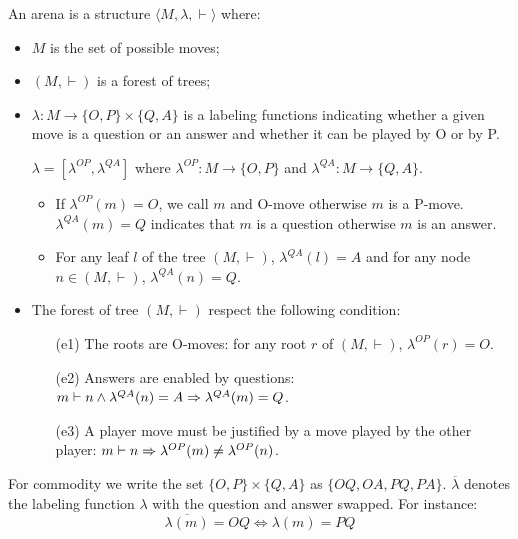 \begin{dfn}[Arena]
An arena is a structure $\langle M, \lambda, \vdash \rangle$ where:
\begin{itemize}
\item $M$ is the set of possible moves;
\item $(M,\vdash)$ is a forest of trees;

\item $\lambda : M \rightarrow \{ O, P\} \times \{Q, A\}$ is a labeling functions indicating whether a given move
    is a question or an answer and whether it can be played by O or by P.

    $\lambda = [\lambda^{OP},\lambda^{QA}]$ where $\lambda^{OP} : M \rightarrow  \{ O, P\}$
    and $\lambda^{QA} : M \rightarrow  \{ Q, A\}$.

    \begin{itemize}
    \item If $\lambda^{OP} (m) = O$, we call $m$ and O-move otherwise $m$ is a P-move.
    $\lambda^{QA} (m) = Q$ indicates that $m$ is a question otherwise $m$ is an answer.

    \item For any leaf $l$ of the tree $(M,\vdash)$, $\lambda^{QA} (l) = A$ and for any node
    $n \in (M,\vdash)$, $\lambda^{QA} (n) = Q$.
    \end{itemize}

\item The forest of tree $(M,\vdash)$ respect the following condition:
    \begin{itemize}
    \item[(e1)] The roots are O-moves: for any root $r$ of $(M,\vdash)$, $\lambda^{OP} (r) = O$.
    \item[(e2)] Answers are enabled by questions: $m \vdash n  \wedge \lambda^{QA}(n) = A \Rightarrow \lambda^{QA}(m) = Q$.
    \item[(e3)] A player move must be justified by a move played by the other player:
         $m\vdash n \Rightarrow \lambda^{OP}(m) \neq \lambda^{OP}(n)$.
    \end{itemize}
\end{itemize}
\end{dfn}

For commodity we write the set $\{O,P\} \times \{Q,A\}$ as $\{OQ,OA,PQ,PA\}$.
$\overline{\lambda}$ denotes the labeling function $\lambda$ with the question and answer swapped. For instance:
$$\overline{\lambda(m)} = OQ \iff \lambda(m) = PQ$$

